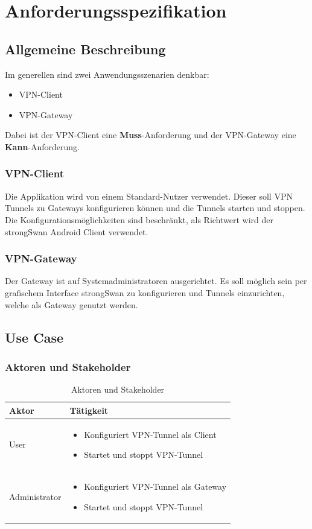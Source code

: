 \section{Anforderungsspezifikation}
\subsection{Allgemeine Beschreibung}
Im generellen sind zwei Anwendungsszenarien denkbar:
\begin{itemize}
	\item VPN-Client
	\item VPN-Gateway
\end{itemize}
\medskip
Dabei ist der VPN-Client eine \textbf{Muss}-Anforderung und der VPN-Gateway eine \textbf{Kann}-Anforderung.
\medskip
\subsubsection{VPN-Client}
Die Applikation wird von einem Standard-Nutzer verwendet. Dieser soll VPN Tunnels zu Gateways konfigurieren können und die Tunnels starten und stoppen. Die Konfigurationsmöglichkeiten sind beschränkt, als Richtwert wird der strongSwan Android Client verwendet.\\


\subsubsection{VPN-Gateway}
Der Gateway ist auf Systemadministratoren ausgerichtet. Es soll möglich sein per grafischem Interface strongSwan zu konfigurieren und Tunnels einzurichten, welche als Gateway genutzt werden. 

\subsection{Use Case}
\subsubsection{Aktoren und Stakeholder}
\begin{table}[H]
\centering
    \begin{tabular}{|p{3cm}|p{9cm}|}
    \hline
    \rowcolor{lightblue}
    Aktor & Tätigkeit   \\ \hline
	User  & 
			\begin{itemize}
			\item Konfiguriert VPN-Tunnel als Client
    		\item Startet und stoppt VPN-Tunnel
		\end{itemize}	
	\\ \hline
	Administrator & 
			\begin{itemize}
			\item Konfiguriert VPN-Tunnel als Gateway
    		\item Startet und stoppt VPN-Tunnel
		\end{itemize}	
	\\ \hline
	\end{tabular}
    \caption[Aktoren und Stakeholder]{Aktoren und Stakeholder}
\end{table}




